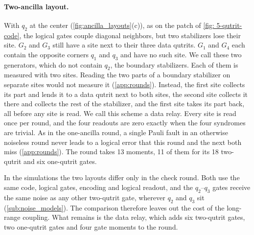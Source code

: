 \paragraph{Two-ancilla layout.} With $q_2$ at the center (\autoref{fig:ancilla_layouts}(c)), as on the patch of \autoref{fig: 5-qutrit-code}, the logical gates couple diagonal neighbors, but two stabilizers lose their site. $G_2$ and $G_3$ still have a site next to their three data qutrits. $G_1$ and $G_4$ each contain the opposite corners $q_1$ and $q_3$ and have no such site. We call these two generators, which do not contain $q_2$, the boundary stabilizers. Each of them is measured with two sites. Reading the two parts of a boundary stabilizer on separate sites would not measure it (\autoref{app:rounds}). Instead, the first site collects its part and lends it to a data qutrit next to both sites, the second site collects it there and collects the rest of the stabilizer, and the first site takes its part back, all before any site is read. We call this scheme a data relay. Every site is read once per round, and the four readouts are zero exactly when the four syndromes are trivial. As in the one-ancilla round, a single Pauli fault in an otherwise noiseless round never leads to a logical error that this round and the next both miss (\autoref{app:rounds}). The round takes 13 moments, 11 of them for its 18 two-qutrit and six one-qutrit gates.

In the simulations the two layouts differ only in the check round. Both use the same code, logical gates, encoding and logical readout, and the $q_2$--$q_3$ gates receive the same noise as any other two-qutrit gate, wherever $q_2$ and $q_3$ sit (\autoref{sub:noise_models}). The comparison therefore leaves out the cost of the long-range coupling. What remains is the data relay, which adds six two-qutrit gates, two one-qutrit gates and four gate moments to the round.
